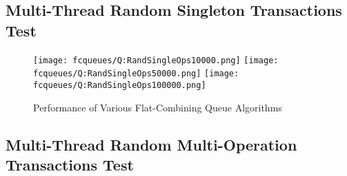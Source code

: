 \subsection{Multi-Thread Random Singleton Transactions Test}
\begin{figure}[ht!]
\centering
\texttt{[image: fcqueues/Q:RandSingleOps10000.png]}
\texttt{[image: fcqueues/Q:RandSingleOps50000.png]}
\texttt{[image: fcqueues/Q:RandSingleOps100000.png]}
\caption{Performance of Various Flat-Combining Queue Algorithms}
\label{fig:txnal_queues}
\end{figure}
\fi
\subsection{Multi-Thread Random Multi-Operation Transactions Test}

